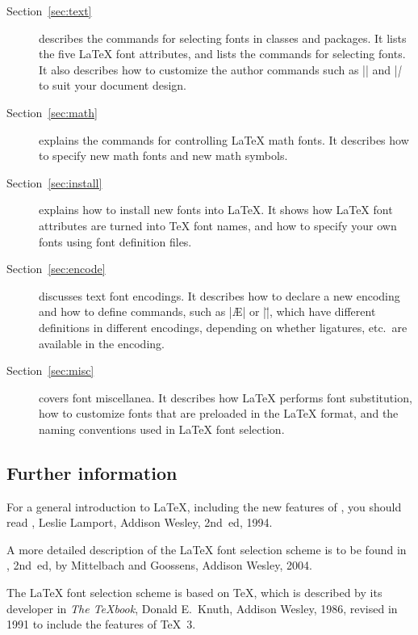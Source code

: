 \documentclass{ltxguide}[1995/11/28]
\begin{document}
\begin{description}

\item[Section~\ref{sec:text}] describes the commands for selecting fonts
  in classes and packages.  It lists the five \LaTeX{} font attributes,
  and lists the commands for selecting fonts.  It also describes how to
  customize the author commands such as |\textrm| and |\textit| to suit
  your document design.

\item[Section~\ref{sec:math}] explains the commands for controlling
  \LaTeX{} math fonts.  It describes how to specify new math fonts and
  new math symbols.

\item[Section~\ref{sec:install}] explains how to install new fonts into
  \LaTeX.  It shows how \LaTeX{} font attributes are turned into \TeX{}
  font names, and how to specify your own fonts using font definition
  files.

\item[Section~\ref{sec:encode}] discusses text font encodings.  It
  describes how to declare a new encoding and how to define commands,
  such as |\AE| or |\"|, which have different definitions in different
  encodings, depending on whether ligatures, etc.\ are available in the
  encoding.

\item[Section~\ref{sec:misc}] covers font miscellanea.  It describes how
  \LaTeX{} performs font substitution, how to customize fonts that are
  preloaded in the \LaTeX{} format, and the naming conventions used in
  \LaTeX{} font selection.

\end{description}

\subsection{Further information}

For a general introduction to \LaTeX, including the new features of
\LaTeXe, you should read \emph{\LaTeXbook}, Leslie Lamport, Addison
Wesley, 2nd~ed, 1994.

A more detailed description of the \LaTeX{} font selection scheme is to
be found in \emph{\LaTeXcomp}, 2nd~ed, by Mittelbach and Goossens,
Addison Wesley, 2004.

The \LaTeX{} font selection scheme is based on \TeX, which is described
by its developer in \emph{The \TeX book}, Donald E.~Knuth, Addison
Wesley, 1986, revised in 1991 to include the features of \TeX~3.
\end{document}
